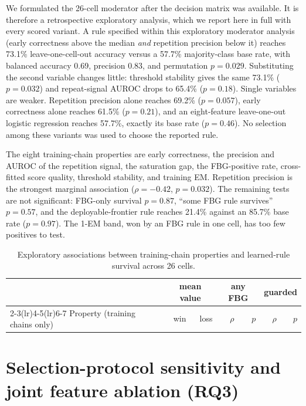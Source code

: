 \documentclass[manuscript,nonacm]{acmart}
\begin{document}
We formulated the 26-cell moderator after the decision matrix was available.
It is therefore a retrospective exploratory analysis, which we report here in
full with every scored variant. A rule specified within this
exploratory moderator analysis (early correctness above the median \emph{and}
repetition precision below it) reaches 73.1\% leave-one-cell-out accuracy
versus a 57.7\% majority-class base rate, with balanced
accuracy 0.69, precision 0.83, and permutation $p{=}0.029$. Substituting the
second variable changes little: threshold stability gives the same 73.1\%
($p{=}0.032$) and repeat-signal AUROC drops to 65.4\% ($p{=}0.18$). Single
variables are weaker. Repetition precision alone reaches 69.2\%
($p{=}0.057$), early correctness alone reaches 61.5\% ($p{=}0.21$), and an
eight-feature leave-one-out
logistic regression reaches 57.7\%, exactly its base rate ($p{=}0.46$). No
selection among these variants was used to choose the reported rule.

The eight training-chain properties are early correctness, the precision and
AUROC of the repetition signal, the saturation
gap, the FBG-positive rate, cross-fitted score quality, threshold stability,
and training EM. Repetition precision is the strongest marginal association
($\rho{=}-0.42$, $p{=}0.032$). The remaining tests are not significant:
FBG-only survival
$p{=}0.87$, ``some FBG rule survives'' $p{=}0.57$, and the deployable-frontier
rule reaches 21.4\% against an 85.7\% base rate ($p{=}0.97$). The 1-EM band,
won by an FBG rule in one cell, has too few positives to test.

\begin{table}[!htbp]
\caption{Exploratory associations between training-chain properties and
learned-rule survival across 26 cells.}
\label{tab:supp-whenwins}
\footnotesize
\setlength{\tabcolsep}{4pt}
\begin{tabular}{lrrrrrr}
\toprule
& \multicolumn{2}{c}{mean value} & \multicolumn{2}{c}{any FBG} & \multicolumn{2}{c}{guarded} \\
\cmidrule(lr){2-3}\cmidrule(lr){4-5}\cmidrule(lr){6-7}
Property (training chains only) & win & loss & $\rho$ & $p$ & $\rho$ & $p$ \\
\midrule

\bottomrule
\end{tabular}
\end{table}

\FloatBarrier
\section{Selection-protocol sensitivity and joint feature ablation (RQ3)}
\label{supp:sensitivity}
\end{document}
